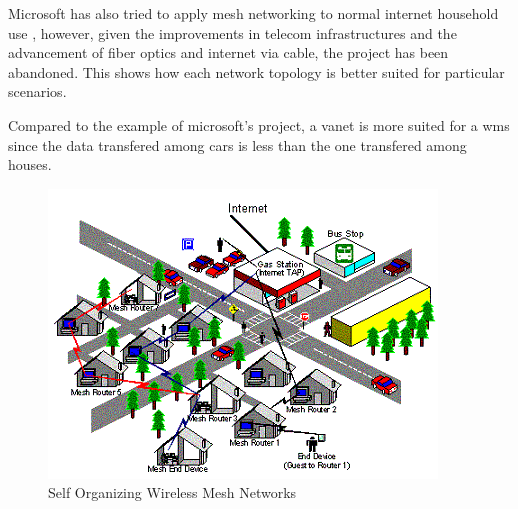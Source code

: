 		Microsoft has also tried to apply mesh networking to normal internet household use \cite{bahl2009opportunistic}, however, given the improvements in telecom infrastructures and the advancement of fiber optics and internet via cable, the project has been abandoned.
		This shows how each network topology is better suited for particular scenarios.
		
		Compared to the example of microsoft's project, a vanet is more suited for a wms since the data transfered among cars is less than the one transfered among houses.
		
		\noindent
		\begin{minipage}{0.52\textwidth}%
			\begin{figure}[H]
				\centering
				\includegraphics[width=\textwidth]{resources/img/chap4/wms_microsoft}
				\caption[Self Organizing Wireless Mesh Networks]{Self Organizing Wireless Mesh Networks \cite{bahl2009opportunistic}}
				\label{img:wms_microsoft}
			\end{figure}
		\end{minipage}%
		\hfill%
